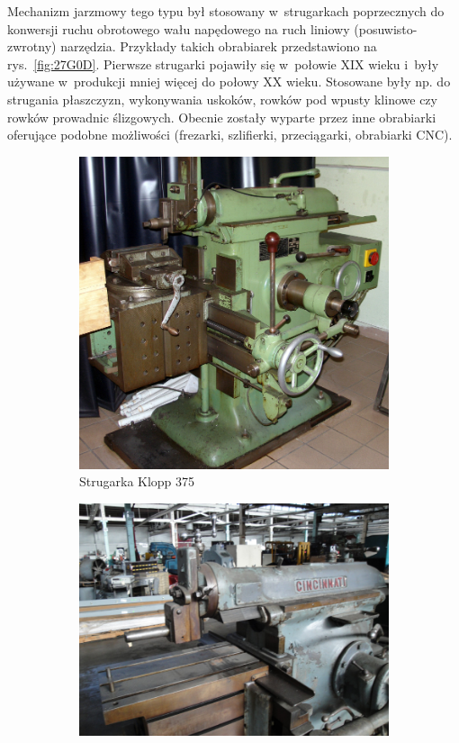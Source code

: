 \documentclass[paper=a4,DIV=12]{tmmlab}
\begin{document}
Mechanizm jarzmowy tego typu był stosowany w~strugarkach poprzecznych do
konwersji ruchu obrotowego wału napędowego na ruch liniowy (posuwisto-zwrotny)
narzędzia. Przykłady takich obrabiarek przedstawiono na rys.~\ref{fig:27G0D}.
Pierwsze strugarki pojawiły się w~połowie XIX wieku i~były używane w~produkcji
mniej więcej do połowy XX wieku. Stosowane były np. do strugania płaszczyzn,
wykonywania uskoków, rowków pod wpusty klinowe czy rowków prowadnic
ślizgowych. Obecnie zostały wyparte przez inne obrabiarki oferujące podobne
możliwości (frezarki, szlifierki, przeciągarki, obrabiarki CNC).
\begin{figure}[htbp]
  \centering
  \begin{subfigure}[b]{0.375\textwidth}
    \includegraphics[height=0.26\textheight]{lab11/klopp375}
    \caption{Strugarka Klopp 375}
    \label{fig:ZGSAS}
  \end{subfigure}
  \begin{subfigure}[b]{0.5\textwidth}
    \includegraphics[height=0.26\textheight]{lab11/cincinnati}

\end{subfigure}
\end{figure}
\end{document}
